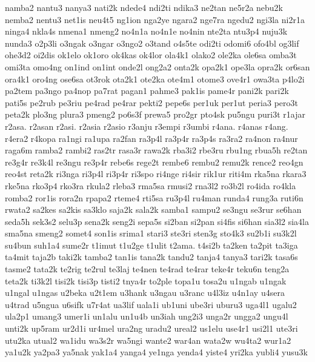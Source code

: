 {namba2 nantu3 nanya3 nati2k ndede4 ndi2ti ndika3 ne2tan ne5r2a nebu2k nemba2 nentu3 net1is neu4t5 ng1ion nga2ye ngara2 nge7ra ngedu2 ngi3la ni2r1a ninga4 nkla4s nmena1 nmeng2 no4n1a no4n1e no4nin nte2ta ntu3p4 nuju3k nunda3 o2p3li o3ngak o3ngar o3ngo2 o3tand o4s5te odi2ti odomi6 ofo4bl og3lif ohe3d2 oi2dis ok1elo ok1oro ok4kas ok4lor ola4k1 olako2 ole2ka ole6sa omba3t omi3ta omo4ng on1ind on1int onde2l ong2a2 onta2k opa2k1 ope3la opra2k or6san ora4k1 oro4ng ose6sa ot3rok ota2k1 ote2ka ote4m1 otome3 ove4r1 owa3ta p4lo2i pa2tem pa3ngo pa4nop pa7rat pagan1 pahme3 pak1is pame4r pani2k pari2k pati5s pe2rub pe3riu pe4rad pe4rar pekti2 pepe6s per1uk per1ut peria3 pero3t peta2k plo3ng plura3 pmeng2 po6s3f prewa5 pro2gr pto4sk pu5ngu puri3t r1ajar r2asa. r2asan r2asi. r2asia r2asio r3anju r3empi r3umbi r4ana. r4anas r4ang. r4era2 r4kopa ra1ngi ra1upa ra2fan ra3p4l ra3p4r ra3p4s ra3ra2 ra4non ra4nur raga6m ramba2 rambi2 ras2tr rasa3r rawa2k rba3i2 rbe3ru rbu1ng rbua5h re2tan re3g4r re3k4l re3ngu re3p4r rebe6s rege2t rembe6 rembu2 remu2k rence2 reo4gn reo4st reta2k ri3nga ri3p4l ri3p4r ri3spo ri4nge ri4sir rik1ur riti4m rka5na rkara3 rke5na rko3p4 rko3ra rkula2 rleba3 rma5sa rmusi2 rna3l2 ro3b2l ro4ida ro4kla romba2 ror1is rora2n rpapa2 rteme4 rti5sa ru3p4l ru4man runda4 rung3a ruti6n rwata2 sa2kes sa2kis sa3klo saja2k sala2k samba1 sampu2 se3ngu se3rur se6han seda5h sek3s2 selu3p sena2k seng2i sepa5s si2ban si2pan si4fis si6han sia3l2 sia4la sma5na smeng2 somet4 son1is srima1 stari3 ste3ri sten3g sto4k3 su2b1i su3k2l su4bun suh1a4 sume2r t1imut t1u2ge t1ulit t2ama. t4si2b ta2ken ta2pit ta3iga ta4mit taja2b taki2k tamba2 tan1is tana2k tandu2 tanja4 tanya3 tari2k tasa6s tasme2 tata2k te2rig te2rul te3laj te4nen te4rad te4rar teke4r teku6n teng2a teta2k ti3k2l tisi2k tisi3p tisti2 tnya4r to2ple topa1u tosa2u u1ngab u1ngak u1ngal u1ngas u2beka u2t1em u3hank u3ngau u3ranc u4l3iz u4n1ay u4sera u4trad u5ngua u6sifk u7r4at ua3lif uala1i ub1uni ube3ri uburu3 uga4l1 ugalu2 ula2p1 umang3 umer1i un1alu un1u4b un3iah ung2i3 unga2r ungga2 ungu4l unti2k up5ram ur2d1i ur4mel ura2ng uradu2 ureal2 us1elu use4r1 usi2l1 ute3ri utu2ka utual2 wa1idu wa3s2r wa5ngi wante2 war4an wata2w wu4ta2 wur1a2 ya1u2k ya2pa3 ya5nak yak1a4 yanga4 ye1nga yenda4 yiste4 yri2ka yubli4 yusu3k
}
